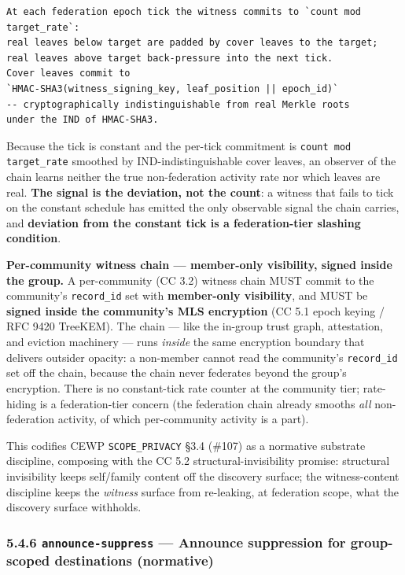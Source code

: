 \documentclass[11pt]{article}
\begin{document}
\begin{lstlisting}
At each federation epoch tick the witness commits to `count mod target_rate`:
real leaves below target are padded by cover leaves to the target;
real leaves above target back-pressure into the next tick.
Cover leaves commit to
`HMAC-SHA3(witness_signing_key, leaf_position || epoch_id)`
-- cryptographically indistinguishable from real Merkle roots
under the IND of HMAC-SHA3.
\end{lstlisting}

Because the tick is constant and the per-tick commitment is \texttt{count mod target\_rate} smoothed by IND-indistinguishable cover leaves, an observer of the chain learns neither the true non-federation activity rate nor which leaves are real. \textbf{The signal is the deviation, not the count}: a witness that fails to tick on the constant schedule has emitted the only observable signal the chain carries, and \textbf{deviation from the constant tick is a federation-tier slashing condition}.


\textbf{Per-community witness chain — member-only visibility, signed inside the group.} A per-community (CC 3.2) witness chain MUST commit to the community's \texttt{record\_id} set with \textbf{member-only visibility}, and MUST be \textbf{signed inside the community's MLS encryption} (CC 5.1 epoch keying / RFC 9420 TreeKEM). The chain — like the in-group trust graph, attestation, and eviction machinery — runs \textit{inside} the same encryption boundary that delivers outsider opacity: a non-member cannot read the community's \texttt{record\_id} set off the chain, because the chain never federates beyond the group's encryption. There is no constant-tick rate counter at the community tier; rate-hiding is a federation-tier concern (the federation chain already smooths \textit{all} non-federation activity, of which per-community activity is a part).


This codifies CEWP \texttt{SCOPE\_PRIVACY} §3.4 (\#107) as a normative substrate discipline, composing with the CC 5.2 structural-invisibility promise: structural invisibility keeps self/family content off the discovery surface; the witness-content discipline keeps the \textit{witness} surface from re-leaking, at federation scope, what the discovery surface withholds.


\subsubsection*{5.4.6 \texttt{announce-suppress} — Announce suppression for group-scoped destinations (normative)}
\end{document}
